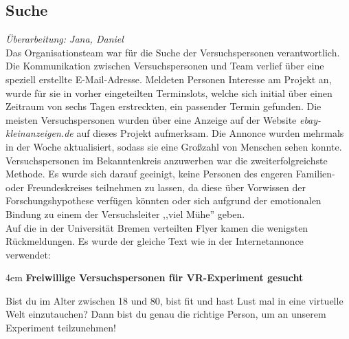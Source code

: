 \documentclass{Bericht}
\begin{document}



\subsection{Suche}
\textit{Überarbeitung: Jana, Daniel}\\
Das Organisationsteam war für die Suche der Versuchspersonen verantwortlich. Die Kommunikation zwischen Versuchspersonen und Team verlief über eine speziell erstellte E-Mail-Adresse. Meldeten Personen Interesse am Projekt an, wurde für sie in vorher eingeteilten Terminslots, welche sich initial über einen Zeitraum von sechs Tagen erstreckten, ein passender Termin gefunden.
Die meisten Versuchspersonen wurden über eine Anzeige auf der Website \textit{ebay-kleinanzeigen.de} auf dieses Projekt aufmerksam. Die Annonce wurden mehrmals in der Woche aktualisiert, sodass sie eine Großzahl von Menschen sehen konnte.\\
Versuchspersonen im Bekanntenkreis anzuwerben war die zweiterfolgreichste Methode. Es wurde sich darauf geeinigt, keine Personen des engeren Familien- oder Freundeskreises teilnehmen zu lassen, da diese über Vorwissen der Forschungshypothese verfügen könnten oder sich aufgrund der emotionalen Bindung zu einem der Versuchsleiter ,,viel Mühe'' geben.\\
Auf die in der Universität Bremen verteilten Flyer kamen die wenigsten Rückmeldungen. Es wurde der gleiche Text wie in der Internetannonce verwendet:\\

\par
\begingroup
\leftskip4em
\textbf{Freiwillige Versuchspersonen für VR-Experiment gesucht}

Bist du im Alter zwischen 18 und 80, bist fit und hast Lust mal in eine virtuelle Welt einzutauchen? Dann bist du genau die richtige Person, um an unserem Experiment teilzunehmen!
\end{document}
